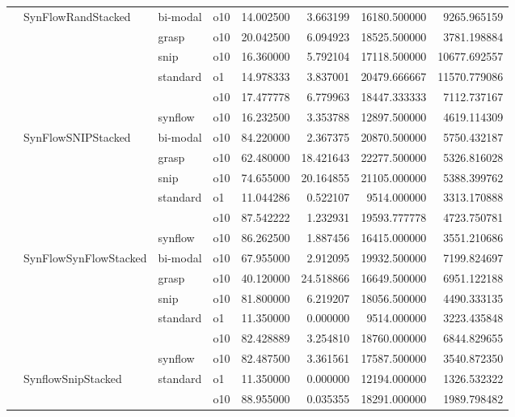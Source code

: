\begin{longtable}{llllrrrr}
      & SynFlowRandStacked & bi-modal & o10 &  14.002500 &   3.663199 &     16180.500000 &   9265.965159 \\
      &     & grasp & o10 &  20.042500 &   6.094923 &     18525.500000 &   3781.198884 \\
      &     & snip & o10 &  16.360000 &   5.792104 &     17118.500000 &  10677.692557 \\
      &     & standard & o1 &  14.978333 &   3.837001 &     20479.666667 &  11570.779086 \\
      &     &         & o10 &  17.477778 &   6.779963 &     18447.333333 &   7112.737167 \\
      &     & synflow & o10 &  16.232500 &   3.353788 &     12897.500000 &   4619.114309 \\
      & SynFlowSNIPStacked & bi-modal & o10 &  84.220000 &   2.367375 &     20870.500000 &   5750.432187 \\
      &     & grasp & o10 &  62.480000 &  18.421643 &     22277.500000 &   5326.816028 \\
      &     & snip & o10 &  74.655000 &  20.164855 &     21105.000000 &   5388.399762 \\
      &     & standard & o1 &  11.044286 &   0.522107 &      9514.000000 &   3313.170888 \\
      &     &         & o10 &  87.542222 &   1.232931 &     19593.777778 &   4723.750781 \\
      &     & synflow & o10 &  86.262500 &   1.887456 &     16415.000000 &   3551.210686 \\
      & SynFlowSynFlowStacked & bi-modal & o10 &  67.955000 &   2.912095 &     19932.500000 &   7199.824697 \\
      &     & grasp & o10 &  40.120000 &  24.518866 &     16649.500000 &   6951.122188 \\
      &     & snip & o10 &  81.800000 &   6.219207 &     18056.500000 &   4490.333135 \\
      &     & standard & o1 &  11.350000 &   0.000000 &      9514.000000 &   3223.435848 \\
      &     &         & o10 &  82.428889 &   3.254810 &     18760.000000 &   6844.829655 \\
      &     & synflow & o10 &  82.487500 &   3.361561 &     17587.500000 &   3540.872350 \\
      & SynflowSnipStacked & standard & o1 &  11.350000 &   0.000000 &     12194.000000 &   1326.532322 \\
      &     &         & o10 &  88.955000 &   0.035355 &     18291.000000 &   1989.798482 \\

\end{longtable}
